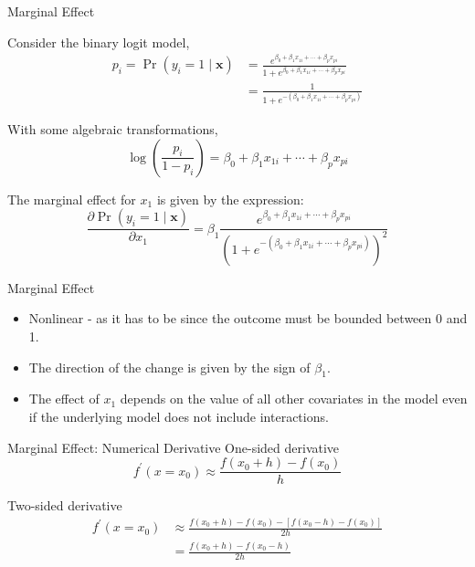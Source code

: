 \begin{frame}{Marginal Effect}

Consider the binary logit model,
$$
\begin{aligned}
p_i=\operatorname{Pr}\left(y_i=1 \mid \boldsymbol{x}\right)
&=\frac{e^{\beta_0+\beta_1 x_{1 i}+\cdots+\beta_p x_{p i}}}{1+e^{\beta_0+\beta_1 x_{1 i}+\cdots+\beta_p x_{p i}}} \\
&=\frac{1}{1+e^{-\left(\beta_0+\beta_1 x_{1 i}+\cdots+\beta_p x_{p i}\right)}}
\end{aligned}
$$

With some algebraic transformations,
$$
\log \left(\frac{p_i}{1-p_i}\right)=\beta_0+\beta_1 x_{1 i}+\cdots+\beta_p x_{p i}
$$



The marginal effect for $x_1$ is given by the expression:
$$
\frac{\partial \operatorname{Pr}\left(y_i=1 \mid \boldsymbol{x}\right)}{\partial x_1}=\beta_1 \frac{e^{\beta_0+\beta_1 x_{1 i}+\cdots+\beta_p x_{p i}}}{\left(1+e^{-\left(\beta_0+\beta_1 x_{1 i}+\cdots+\beta_p x_{p i}\right)}\right)^2}
$$
\end{frame}



\begin{frame}{Marginal Effect}
\begin{itemize}
\item Nonlinear - as it has to be since the outcome must be bounded between 0 and 1.
\item The direction of the change is given by the sign of $\beta_1$.
\item The effect of $x_1$ depends on the value of all other covariates in the model even if the underlying model does not include interactions.
\end{itemize}
\end{frame}





\begin{frame}{Marginal Effect: Numerical Derivative}
One-sided derivative
$$f^{\prime}\left(x=x_0\right) \approx \frac{f\left(x_0+h\right)-f\left(x_0\right)}{h}$$

Two-sided derivative
$$
\begin{aligned}
f^{\prime}\left(x=x_0\right)
&\approx \frac{f\left(x_0+h\right)-f\left(x_0\right)-\left[f\left(x_0-h\right)-f\left(x_0\right)\right]}{2 h} \\
&=\frac{f\left(x_0+h\right)-f\left(x_0-h\right)}{2 h}
\end{aligned}
$$
\end{frame}




